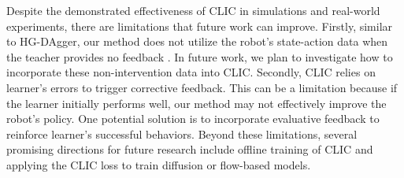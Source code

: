 Despite the demonstrated effectiveness of CLIC in simulations and real-world experiments, there are limitations that future work can improve.
Firstly, similar to HG-DAgger, our method does not utilize the robot's state-action data when the teacher provides no feedback \cite{2020_RSS_expert_interventio_learning}.
In future work, we plan to investigate how to incorporate these non-intervention data into CLIC. 
Secondly, 
CLIC relies on learner's errors to trigger corrective feedback. 
This can be a limitation because if the learner initially performs well, our method may not effectively improve the robot's policy. One potential solution is to incorporate evaluative feedback to reinforce learner's successful behaviors.
Beyond these limitations, several promising directions for future research include offline training of CLIC and applying the CLIC loss to train diffusion or flow-based models.


